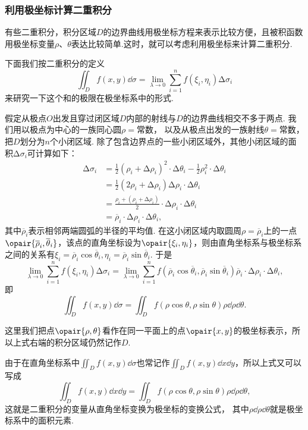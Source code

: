 \subsubsection{利用极坐标计算二重积分}
有些二重积分，积分区域\(D\)的边界曲线用极坐标方程来表示比较方便，且被积函数用极坐标变量\(\rho\)、\(\theta\)表达比较简单.这时，就可以考虑利用极坐标来计算二重积分.

下面我们按二重积分的定义\[
\iint_D f(x,y) \dd{\sigma}
= \lim\limits_{\lambda\to0} \sum\limits_{i=1}^n f(\xi_i,\eta_i) \increment\sigma_i
\]来研究一下这个和的极限在极坐标系中的形式.

假定从极点\(O\)出发且穿过闭区域\(D\)内部的射线与\(D\)的边界曲线相交不多于两点.
我们用以极点为中心的一族同心圆\(\rho = \text{常数}\)，%
以及从极点出发的一族射线\(\theta = \text{常数}\)，%
把\(D\)划分为\(n\)个小闭区域.
除了包含边界点的一些小闭区域外，其他小闭区域的面积\(\increment\sigma_i\)可计算如下：
\begin{align*}
\increment\sigma_i
&= \frac{1}{2} (\rho_i+\increment\rho_i)^2 \cdot \increment\theta_i
- \frac{1}{2} \rho_i^2 \cdot \increment\theta_i \\
&= \frac{1}{2} (2\rho_i + \increment\rho_i) \increment\rho_i \cdot \increment\theta_i \\
&= \frac{\rho_i + (\rho_i+\increment\rho_i)}{2} \cdot \increment\rho_i \cdot \increment\theta_i \\
&= \overline{\rho}_i \cdot \increment\rho_i \cdot \increment\theta_i,
\end{align*}
其中\(\overline{\rho}_i\)表示相邻两端圆弧的半径的平均值.
在这小闭区域内取圆周\(\rho = \overline{\rho}_i\)上的一点\(\opair{\overline{\rho}_i,\overline{\theta}_i}\)，该点的直角坐标设为\(\opair{\xi_i,\eta_i}\)，则由直角坐标系与极坐标系之间的关系有\(\xi_i = \overline{\rho}_i \cos\overline{\theta}_i,
\eta_i = \overline{\rho}_i \sin\overline{\theta}_i\).
于是\[
\lim\limits_{\lambda\to0} \sum\limits_{i=1}^n f(\xi_i,\eta_i) \increment\sigma_i
= \lim\limits_{\lambda\to0} \sum\limits_{i=1}^n f(\overline{\rho}_i \cos\overline{\theta}_i,\overline{\rho}_i \sin\overline{\theta}_i) \overline{\rho}_i \cdot \increment\rho_i \cdot \increment\theta_i,
\]即\[
\iint_D f(x,y) \dd{\sigma}
= \iint_D f(\rho\cos\theta,\rho\sin\theta) \rho \dd{\rho} \dd{\theta}.
\]

这里我们把点\(\opair{\rho,\theta}\)看作在同一平面上的点\(\opair{x,y}\)的极坐标表示，所以上式右端的积分区域仍然记作\(D\).

由于在直角坐标系中\(\iint_D f(x,y) \dd{\sigma}\)也常记作\(\iint_D f(x,y) \dd{x} \dd{y}\)，所以上式又可以写成
\begin{equation}\label{equation:线性方程组.二重积分坐标变换公式}
\iint_D f(x,y) \dd{x} \dd{y}
= \iint_D f(\rho\cos\theta,\rho\sin\theta) \rho \dd{\rho} \dd{\theta},
\end{equation}
这就是二重积分的变量从直角坐标变换为极坐标的变换公式，%
其中\(\rho \dd{\rho} \dd{\theta}\)就是极坐标系中的面积元素.

